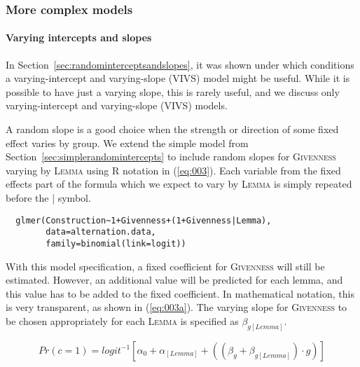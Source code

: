 \subsubsection{More complex models}
\label{sec:morecomplexmodels}

\paragraph{Varying intercepts and slopes}

In Section~\ref{sec:randominterceptsandslopes}, it was shown under which conditions a varying-intercept and varying-slope (VIVS) model might be useful.
While it is possible to have just a varying slope, this is rarely useful, and we discuss only varying-intercept and varying-slope (VIVS) models.

A random slope is a good choice when the strength or direction of some fixed effect varies by group.
We extend the simple model from Section~\ref{sec:simplerandomintercepts} to include random slopes for \textsc{Givenness} varying by \textsc{Lemma} using R notation in (\ref{eq:003}).
Each variable from the fixed effects part of the formula which we expect to vary by \textsc{Lemma} is simply repeated before the | symbol.

\begin{lstlisting}
  glmer(Construction~1+Givenness+(1+Givenness|Lemma),
        data=alternation.data,
        family=binomial(link=logit))
\end{lstlisting}

With this model specification, a fixed coefficient for \textsc{Givenness} will still be estimated.
However, an additional value will be predicted for each lemma, and this value has to be added to the fixed coefficient.
In mathematical notation, this is very transparent, as shown in (\ref{eq:003a}).
The varying slope for \textsc{Givenness} to be chosen appropriately for each \textsc{Lemma} is specified as $\beta_{g[Lemma]}$.

\begin{equation}
  Pr(c=1)=logit^{-1}\left[\alpha_0+\alpha_{[Lemma]}+((\beta_{g}+\beta_{g[Lemma]}) \cdot g)\right]
  \label{eq:003a}
\end{equation}

